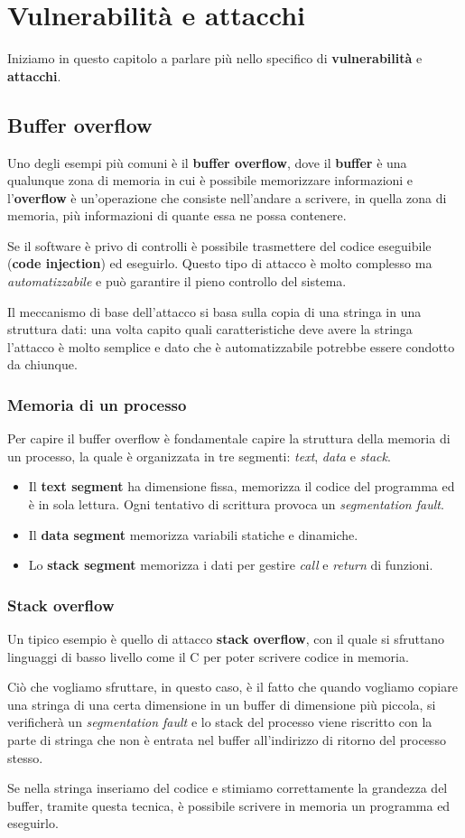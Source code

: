 \chapter{Vulnerabilità e attacchi}
Iniziamo in questo capitolo a parlare più nello specifico di \textbf{vulnerabilità} e \textbf{attacchi}.

\section{Buffer overflow}
Uno degli esempi più comuni è il \textbf{buffer overflow}, dove il \textbf{buffer} è una qualunque zona di memoria
in cui è possibile memorizzare informazioni e l'\textbf{overflow} è un'operazione che consiste nell'andare a scrivere,
in quella zona di memoria, più informazioni di quante essa ne possa contenere.

Se il software è privo di controlli è possibile trasmettere del codice eseguibile (\textbf{code injection}) ed
eseguirlo. Questo tipo di attacco è molto complesso ma \emph{automatizzabile} e può garantire il pieno controllo del
sistema.

Il meccanismo di base dell'attacco si basa sulla copia di una stringa in una struttura dati: una volta capito quali
caratteristiche deve avere la stringa l'attacco è molto semplice e dato che è automatizzabile potrebbe essere condotto
da chiunque.

\subsection{Memoria di un processo}
Per capire il buffer overflow è fondamentale capire la struttura della memoria di un processo, la quale è organizzata
in tre segmenti: \emph{text}, \emph{data} e \emph{stack}.
\begin{itemize}
	\item Il \textbf{text segment} ha dimensione fissa, memorizza il codice del programma ed è in sola lettura. Ogni
	      tentativo di scrittura provoca un \emph{segmentation fault}.
	\item Il \textbf{data segment} memorizza variabili statiche e dinamiche.
	\item Lo \textbf{stack segment} memorizza i dati per gestire \emph{call} e \emph{return} di funzioni.
\end{itemize}

\subsection{Stack overflow}
Un tipico esempio è quello di attacco \textbf{stack overflow}, con il quale si sfruttano linguaggi di basso livello
come il C per poter scrivere codice in memoria.

Ciò che vogliamo sfruttare, in questo caso, è il fatto che quando vogliamo copiare una stringa di una certa dimensione
in un buffer di dimensione più piccola, si verificherà un \emph{segmentation fault} e lo stack del processo viene
riscritto con la parte di stringa che non è entrata nel buffer all'indirizzo di ritorno del processo stesso.

Se nella stringa inseriamo del codice e stimiamo correttamente la grandezza del buffer, tramite questa tecnica, è
possibile scrivere in memoria un programma ed eseguirlo.
